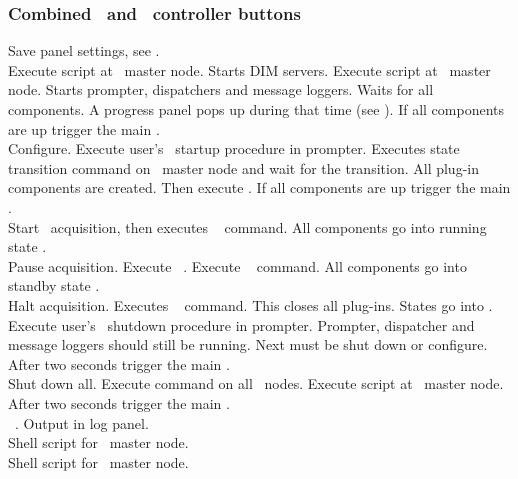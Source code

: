 \subsubsection[Combined DABC and MBS  controller buttons]{Combined \dabc\ and \mbs\  controller buttons}
 Save panel settings, see .\\
  Execute script  at \dabc\ master node.
Starts DIM servers.
Execute script  at \mbs\ master node.
Starts prompter, dispatchers and message loggers.
Waits for all components.
A progress panel pops up during that time
(see ).
If all components are up trigger the main .\\
 Configure. Execute user's \mbs\ startup procedure in prompter.
Executes state transition command 
on \dabc\ master node and wait for the transition.
All plug-in components are created. Then execute .
If all components are up trigger the main .\\
 Start \mbs\ acquisition, then executes \dabc\  command.
All components go into running state .\\
 Pause acquisition. Execute \mbs\ .
Execute \dabc\  command.
All components go into standby state .\\
 Halt acquisition. Executes \dabc\  command.
This closes all plug-ins. States go into . 
Execute user's \mbs\ shutdown procedure in prompter.
Prompter, dispatcher and message loggers should still be running.
Next must be shut down or configure.
After two seconds trigger the main .\\
 Shut down all. Execute  command on all \dabc\ nodes.
Execute script  at \mbs\ master node.
After two seconds trigger the main .\\
 \mbs\ . Output in log panel.\\
 Shell script for \mbs\ master node.\\
 Shell script for \dabc\ master node.


